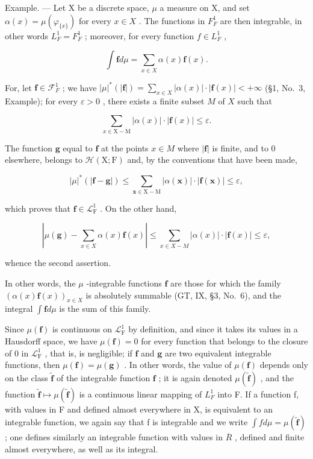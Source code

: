 Example. --- Let X be a discrete space, \(\mu\) a measure on X, and set \(\alpha(x) = \mu(\varphi_{\{x\}})\) for every \(x \in X\) . The functions in \(F_{F}^{1}\) are then integrable, in other words \(L_{F}^{1} = F_{F}^{1}\) ; moreover, for every function \(f \in L_{F}^{1}\) ,

\[
\int \mathbf {f} d \mu = \sum_ {x \in X} \alpha (x) \mathbf {f} (x).
\]

For, let \(\mathbf{f} \in \mathcal{F}_F^1\) ; we have \(|\mu|^*(|\mathbf{f}|) = \sum_{x \in X} |\alpha(x)| \cdot |\mathbf{f}(x)| < +\infty\) (§1, No.~3, Example); for every \(\varepsilon > 0\) , there exists a finite subset \(M\) of \(X\) such that

\[
\sum_ {x \in \mathrm{X} - \mathrm{M}} | \alpha (x) | \cdot | \mathbf {f} (x) | \leqslant \varepsilon .
\]

The function \(\mathbf{g}\) equal to \(\mathbf{f}\) at the points \(x\in M\) where \(|\mathbf{f}|\) is finite, and to 0 elsewhere, belongs to \(\mathcal{H}(\mathrm{X};\mathrm{F})\) and, by the conventions that have been made,

\[
| \mu | ^ {*} (| \mathbf {f} - \mathbf {g} |) \leqslant \sum_ {\boldsymbol {x} \in \mathrm{X} - \mathrm{M}} | \alpha (\boldsymbol {x}) | \cdot | \mathbf {f} (\boldsymbol {x}) | \leqslant \varepsilon ,
\]

which proves that \(\mathbf{f} \in \mathcal{L}_{\mathrm{F}}^{1}\) . On the other hand,

\[
\left| \mu (\mathbf {g}) - \sum_ {x \in X} \alpha (x) \mathbf {f} (x) \right| \leqslant \sum_ {x \in X - M} | \alpha (x) | \cdot | \mathbf {f} (x) | \leqslant \varepsilon ,
\]

whence the second assertion.

In other words, the \(\mu\) -integrable functions \(\mathbf{f}\) are those for which the family \((\alpha(x)\mathbf{f}(x))_{x\in X}\) is absolutely summable (GT, IX, §3, No.~6), and the integral \(\int \mathbf{f} d\mu\) is the sum of this family.

Since \(\mu(\mathbf{f})\) is continuous on \(\mathcal{L}_{\mathrm{F}}^{1}\) by definition, and since it takes its values in a Hausdorff space, we have \(\mu(\mathbf{f}) = 0\) for every function that belongs to the closure of 0 in \(\mathcal{L}_{\mathrm{F}}^{1}\) , that is, is negligible; if \(\mathbf{f}\) and \(\mathbf{g}\) are two equivalent integrable functions, then \(\mu(\mathbf{f}) = \mu(\mathbf{g})\) . In other words, the value of \(\mu(\mathbf{f})\) depends only on the class \(\widetilde{\mathbf{f}}\) of the integrable function \(\mathbf{f}\) ; it is again denoted \(\mu(\widetilde{\mathbf{f}})\) , and the function \(\widetilde{\mathbf{f}} \mapsto \mu(\widetilde{\mathbf{f}})\) is a continuous linear mapping of \(L_{F}^{1}\) into F. If a function f, with values in F and defined almost everywhere in X, is equivalent to an integrable function, we again say that f is integrable and we write \(\int f d\mu = \mu(\widetilde{\mathbf{f}})\) ; one defines similarly an integrable function with values in \(\overline{R}\) , defined and finite almost everywhere, as well as its integral.


